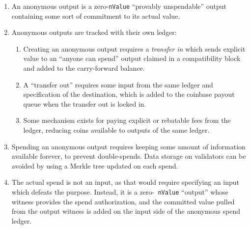 \begin{enumerate}

  \item

    An anonymous output is a zero-{\tt nValue} ``provably
    unspendable'' output containing some sort of commitment to its
    actual value.

  \item

    Anonymous outputs are tracked with their own ledger:

    \begin{enumerate}

      \item

        Creating an anonymous output requires a \emph{transfer in}
        which sends explicit value to an ``anyone can spend'' output
        claimed in a compatibility block and added to the
        carry-forward balance.

      \item

        A ``transfer out'' requires some input from the same ledger
        and specification of the destination, which is added to the
        coinbase payout queue when the transfer out is locked in.

      \item

        Some mechanism exists for paying explicit or rebatable fees
        from the ledger, reducing coins available to outputs of the
        same ledger.

    \end{enumerate}

  \item

    Spending an anonymous output requires keeping some amount of
    information available forever, to prevent double-spends.  Data
    storage on validators can be avoided by using a Merkle tree
    updated on each spend.

  \item

    The actual spend is not an input, as that would require specifying
    an input which defeats the purpose.  Instead, it is a zero-{\tt
      nValue} ``output'' whose witness provides the spend
    authorization, and the committed value pulled from the output
    witness is added on the input side of the anonymous spend ledger.

\end{enumerate}

